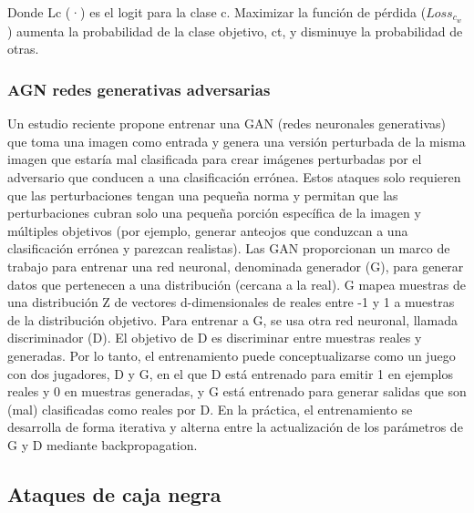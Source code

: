 Donde Lc (·) es el logit para la clase c. Maximizar la función de pérdida ($Loss_{c_w}$) aumenta la probabilidad de la clase objetivo, ct, y disminuye la probabilidad de otras.




\subsubsection{AGN redes generativas adversarias}

Un estudio reciente \parencite{r56} propone entrenar una GAN (redes neuronales generativas) que toma una imagen como entrada y genera una versión perturbada de la misma imagen que estaría mal clasificada para crear imágenes perturbadas por el adversario que conducen a una clasificación errónea. Estos ataques solo requieren que las perturbaciones tengan una pequeña norma y permitan que las perturbaciones cubran solo una pequeña porción específica de la imagen y múltiples objetivos (por ejemplo, generar anteojos que conduzcan a una clasificación errónea y parezcan realistas). 
Las GAN proporcionan un marco de trabajo para entrenar una red neuronal, denominada generador (G), para generar datos que pertenecen a una distribución (cercana a la real). G mapea muestras de una distribución Z de vectores d-dimensionales de reales entre -1 y 1 a muestras de la distribución objetivo. Para entrenar a G, se usa otra red neuronal, llamada discriminador (D). El objetivo de D es discriminar entre muestras reales y generadas. Por lo tanto, el entrenamiento puede conceptualizarse como un juego con dos jugadores, D y G, en el que D está entrenado para emitir 1 en ejemplos reales y 0 en muestras generadas, y G está entrenado para generar salidas que son (mal) clasificadas como reales por D. En la práctica, el entrenamiento se desarrolla de forma iterativa y alterna entre la actualización de los parámetros de G y D mediante backpropagation.

\subsection{Ataques de caja negra}

